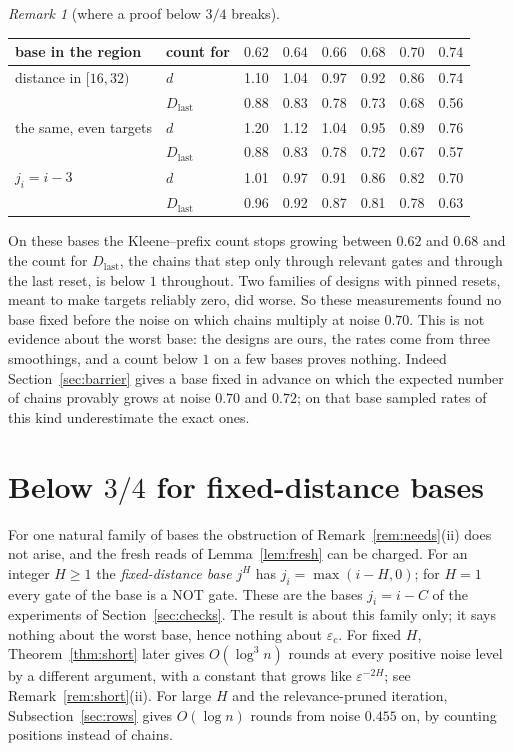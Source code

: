 \documentclass[11pt]{amsart}
\theoremstyle{definition}
\theoremstyle{remark}
\newtheorem{remark}[theorem]{Remark}
\newcommand{\eps}{\varepsilon}
\begin{document}
\begin{remark}[where a proof below $3/4$ breaks]
\begin{enumerate}[label=(\roman*),leftmargin=2.4em]
\begin{center}
\begin{tabular}{llrrrrrr}
\toprule
base in the region & count for & $0.62$ & $0.64$ & $0.66$ & $0.68$ & $0.70$ & $0.74$\\
\midrule
distance in $[16,32)$ & $d$ & 1.10 & 1.04 & 0.97 & 0.92 & 0.86 & 0.74\\
 & $D_{\mathrm{last}}$ & 0.88 & 0.83 & 0.78 & 0.73 & 0.68 & 0.56\\
the same, even targets & $d$ & 1.20 & 1.12 & 1.04 & 0.95 & 0.89 & 0.76\\
 & $D_{\mathrm{last}}$ & 0.88 & 0.83 & 0.78 & 0.72 & 0.67 & 0.57\\
$j_i=i-3$ & $d$ & 1.01 & 0.97 & 0.91 & 0.86 & 0.82 & 0.70\\
 & $D_{\mathrm{last}}$ & 0.96 & 0.92 & 0.87 & 0.81 & 0.78 & 0.63\\
\bottomrule
\end{tabular}
\end{center}

\noindent On these bases the Kleene--prefix count stops growing between $0.62$ and $0.68$ and
the count for $D_{\mathrm{last}}$, the chains that step only through relevant gates and through the last reset, is below $1$ throughout. Two families of
designs with pinned resets, meant to make targets reliably zero, did worse. So these measurements
found no base fixed before the noise on which chains multiply at noise $0.70$. This is not evidence about the worst base:
the designs are ours, the rates come from three smoothings, and a count below $1$ on a few bases
proves nothing. Indeed Section~\ref{sec:barrier} gives a base fixed in advance on which the
expected number of chains provably grows at noise $0.70$ and $0.72$; on that base sampled rates
of this kind underestimate the exact ones.
\end{enumerate}
\end{remark}

\section{Below \texorpdfstring{$3/4$}{3/4} for fixed-distance bases}\label{sec:fixed}

For one natural family of bases the obstruction of Remark~\ref{rem:needs}(ii) does not arise, and
the fresh reads of Lemma~\ref{lem:fresh} can be charged. For an integer $H\ge1$ the
\emph{fixed-distance base} $j^H$ has $j_i=\max(i-H,0)$; for $H=1$ every gate of the base is a NOT gate. These are the bases $j_i=i-C$ of the experiments of
Section~\ref{sec:checks}. The result is about this family only; it says nothing about
the worst base, hence nothing about $\eps_c$. For fixed $H$, Theorem~\ref{thm:short} later gives
$O(\log^3n)$ rounds at every positive noise level by a different argument, with a constant that
grows like $\eps^{-2H}$; see Remark~\ref{rem:short}(ii). For large $H$ and the relevance-pruned
iteration, Subsection~\ref{sec:rows} gives $O(\log n)$ rounds from noise $0.455$ on, by counting
positions instead of chains.
\end{document}
